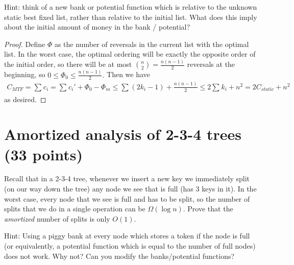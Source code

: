 \documentclass{article}
\begin{document}
\begin{enumerate}[(a)]
		Hint: think of a new bank or potential function which is relative to the unknown static best fixed list, rather than relative to the initial list.  What does this imply about the initial amount of money in the bank / potential?
		\begin{proof}
			Define $\Phi$ as the number of reversals in the current list with the optimal list. In the worst case, the optimal ordering will be exactly the opposite order of the initial order, so there will be at most $\binom{n}{2} = \frac{n(n-1)}{2}$ reversals at the beginning, so $0\le \Phi_0\le \frac{n(n-1)}{2}.$ Then we have
			\begin{align*}
				C_{MTF} = \sum_{}^{}c_i = \sum_{}^{}c_i' + \Phi_0 - \Phi_m \le \sum_{}^{}(2k_i-1) + \frac{n(n-1)}{2} \le 2\sum_{}^{}k_i + n^2 = 2C_{static} + n^2
			\end{align*}
			as desired.
		\end{proof}
\end{enumerate}

\section{Amortized analysis of 2-3-4 trees (33 points)}

Recall that in a 2-3-4 tree, whenever we insert a new key we immediately split (on our way down the tree) any node we see that is full (has 3 keys in it).  In the worst case, every node that we see is full and has to be split, so the number of splits that we do in a single operation can be $\Omega(\log n)$.  Prove that the \emph{amortized} number of splits is only $O(1)$.  

Hint: Using a piggy bank at every node which stores a token if the node is full (or equivalently, a potential function which is equal to the number of full nodes) does not work.  Why not?  Can you modify the banks/potential functions?
\end{document}
